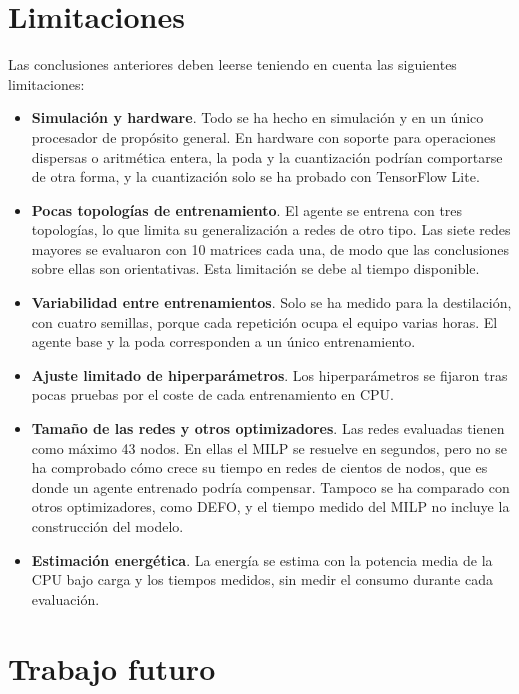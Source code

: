 \section{Limitaciones}\label{sec:con_limitaciones}

Las conclusiones anteriores deben leerse teniendo en cuenta las siguientes limitaciones:

\begin{itemize}
	\item \textbf{Simulación y hardware}. Todo se ha hecho en simulación y en un único procesador de propósito general. En hardware con soporte para operaciones dispersas o aritmética entera, la poda y la cuantización podrían comportarse de otra forma, y la cuantización solo se ha probado con TensorFlow Lite.
	\item \textbf{Pocas topologías de entrenamiento}. El agente se entrena con tres topologías, lo que limita su generalización a redes de otro tipo. Las siete redes mayores se evaluaron con 10 matrices cada una, de modo que las conclusiones sobre ellas son orientativas. Esta limitación se debe al tiempo disponible.
	\item \textbf{Variabilidad entre entrenamientos}. Solo se ha medido para la destilación, con cuatro semillas, porque cada repetición ocupa el equipo varias horas. El agente base y la poda corresponden a un único entrenamiento.
	\item \textbf{Ajuste limitado de hiperparámetros}. Los hiperparámetros se fijaron tras pocas pruebas por el coste de cada entrenamiento en CPU.
	\item \textbf{Tamaño de las redes y otros optimizadores}. Las redes evaluadas tienen como máximo 43 nodos. En ellas el MILP se resuelve en segundos, pero no se ha comprobado cómo crece su tiempo en redes de cientos de nodos, que es donde un agente entrenado podría compensar. Tampoco se ha comparado con otros optimizadores, como DEFO, y el tiempo medido del MILP no incluye la construcción del modelo.
	\item \textbf{Estimación energética}. La energía se estima con la potencia media de la CPU bajo carga y los tiempos medidos, sin medir el consumo durante cada evaluación.
\end{itemize}

\section{Trabajo futuro}\label{sec:con_futuro}


